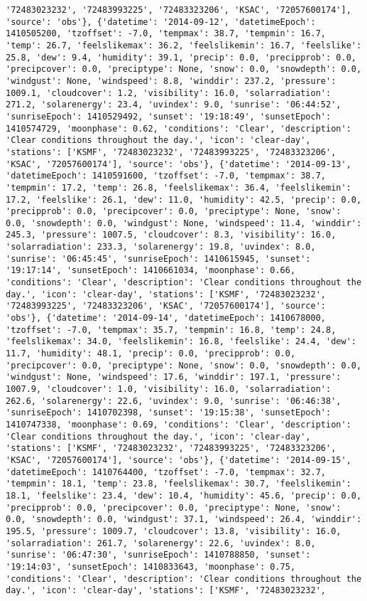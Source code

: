 \documentclass[
  letterpaper,
  DIV=11,
  numbers=noendperiod]{scrartcl}
\begin{document}
\begin{verbatim}
'72483023232', '72483993225', '72483323206', 'KSAC', '72057600174'], 'source': 'obs'}, {'datetime': '2014-09-12', 'datetimeEpoch': 1410505200, 'tzoffset': -7.0, 'tempmax': 38.7, 'tempmin': 16.7, 'temp': 26.7, 'feelslikemax': 36.2, 'feelslikemin': 16.7, 'feelslike': 25.8, 'dew': 9.4, 'humidity': 39.1, 'precip': 0.0, 'precipprob': 0.0, 'precipcover': 0.0, 'preciptype': None, 'snow': 0.0, 'snowdepth': 0.0, 'windgust': None, 'windspeed': 8.8, 'winddir': 237.2, 'pressure': 1009.1, 'cloudcover': 1.2, 'visibility': 16.0, 'solarradiation': 271.2, 'solarenergy': 23.4, 'uvindex': 9.0, 'sunrise': '06:44:52', 'sunriseEpoch': 1410529492, 'sunset': '19:18:49', 'sunsetEpoch': 1410574729, 'moonphase': 0.62, 'conditions': 'Clear', 'description': 'Clear conditions throughout the day.', 'icon': 'clear-day', 'stations': ['KSMF', '72483023232', '72483993225', '72483323206', 'KSAC', '72057600174'], 'source': 'obs'}, {'datetime': '2014-09-13', 'datetimeEpoch': 1410591600, 'tzoffset': -7.0, 'tempmax': 38.7, 'tempmin': 17.2, 'temp': 26.8, 'feelslikemax': 36.4, 'feelslikemin': 17.2, 'feelslike': 26.1, 'dew': 11.0, 'humidity': 42.5, 'precip': 0.0, 'precipprob': 0.0, 'precipcover': 0.0, 'preciptype': None, 'snow': 0.0, 'snowdepth': 0.0, 'windgust': None, 'windspeed': 11.4, 'winddir': 245.3, 'pressure': 1007.5, 'cloudcover': 8.3, 'visibility': 16.0, 'solarradiation': 233.3, 'solarenergy': 19.8, 'uvindex': 8.0, 'sunrise': '06:45:45', 'sunriseEpoch': 1410615945, 'sunset': '19:17:14', 'sunsetEpoch': 1410661034, 'moonphase': 0.66, 'conditions': 'Clear', 'description': 'Clear conditions throughout the day.', 'icon': 'clear-day', 'stations': ['KSMF', '72483023232', '72483993225', '72483323206', 'KSAC', '72057600174'], 'source': 'obs'}, {'datetime': '2014-09-14', 'datetimeEpoch': 1410678000, 'tzoffset': -7.0, 'tempmax': 35.7, 'tempmin': 16.8, 'temp': 24.8, 'feelslikemax': 34.0, 'feelslikemin': 16.8, 'feelslike': 24.4, 'dew': 11.7, 'humidity': 48.1, 'precip': 0.0, 'precipprob': 0.0, 'precipcover': 0.0, 'preciptype': None, 'snow': 0.0, 'snowdepth': 0.0, 'windgust': None, 'windspeed': 17.6, 'winddir': 197.1, 'pressure': 1007.9, 'cloudcover': 1.0, 'visibility': 16.0, 'solarradiation': 262.6, 'solarenergy': 22.6, 'uvindex': 9.0, 'sunrise': '06:46:38', 'sunriseEpoch': 1410702398, 'sunset': '19:15:38', 'sunsetEpoch': 1410747338, 'moonphase': 0.69, 'conditions': 'Clear', 'description': 'Clear conditions throughout the day.', 'icon': 'clear-day', 'stations': ['KSMF', '72483023232', '72483993225', '72483323206', 'KSAC', '72057600174'], 'source': 'obs'}, {'datetime': '2014-09-15', 'datetimeEpoch': 1410764400, 'tzoffset': -7.0, 'tempmax': 32.7, 'tempmin': 18.1, 'temp': 23.8, 'feelslikemax': 30.7, 'feelslikemin': 18.1, 'feelslike': 23.4, 'dew': 10.4, 'humidity': 45.6, 'precip': 0.0, 'precipprob': 0.0, 'precipcover': 0.0, 'preciptype': None, 'snow': 0.0, 'snowdepth': 0.0, 'windgust': 37.1, 'windspeed': 26.4, 'winddir': 195.5, 'pressure': 1009.7, 'cloudcover': 13.8, 'visibility': 16.0, 'solarradiation': 261.7, 'solarenergy': 22.6, 'uvindex': 8.0, 'sunrise': '06:47:30', 'sunriseEpoch': 1410788850, 'sunset': '19:14:03', 'sunsetEpoch': 1410833643, 'moonphase': 0.75, 'conditions': 'Clear', 'description': 'Clear conditions throughout the day.', 'icon': 'clear-day', 'stations': ['KSMF', '72483023232', 
\end{verbatim}
\end{document}
